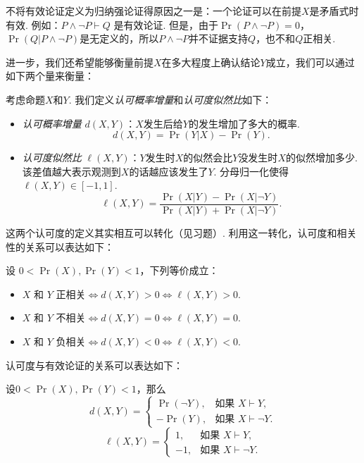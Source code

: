 不将有效论证定义为归纳强论证得原因之一是：一个论证可以在前提$X$是矛盾式时有效. 例如：$P \wedge \neg P \vdash Q$ 是有效论证. 但是，由于$\Pr(P \wedge \neg P) = 0$，$\Pr(Q | P \wedge \neg P)$是无定义的，所以$P \wedge \neg P$并不证据支持$Q$，也不和$Q$正相关.

进一步，我们还希望能够衡量前提$X$在多大程度上确认结论$Y$成立，我们可以通过如下两个量来衡量：
\begin{definition}[认可度]
考虑命题$X$和$Y$. 我们定义\emph{认可概率增量}和\emph{认可度似然比}如下：
\begin{itemize}
\item \emph{认可概率增量} $d(X, Y)$：$X$发生后给$Y$的发生增加了多大的概率.
\[
    d(X, Y) = \Pr(Y|X) - \Pr(Y).
\]
\item \emph{认可度似然比} $\ell(X, Y)$：$Y$发生时$X$的似然会比$Y$没发生时$X$的似然增加多少. 该差值越大表示观测到$X$的话越应该发生了$Y$. 分母归一化使得$\ell(X,Y)\in[-1,1]$.
\[
    \ell(X, Y) = \frac{\Pr(X|Y) - \Pr(X|\neg Y)}{\Pr(X|Y) + \Pr(X|\neg Y)}.
\]
\end{itemize} 
\end{definition}

这两个认可度的定义其实相互可以转化（见习题）. 利用这一转化，认可度和相关性的关系可以表达如下：
\begin{proposition}
    设 $0< \Pr(X),\Pr(Y) < 1$，下列等价成立：
    \begin{itemize}
        \item $X$ 和 $Y$ 正相关$\iff d(X,Y) > 0\iff \ell(X, Y) > 0$.
        \item $X$ 和 $Y$ 不相关$\iff d(X, Y) = 0\iff \ell(X, Y) = 0$. 
        \item $X$ 和 $Y$ 负相关$\iff d(X,Y) < 0\iff\ell(X, Y) < 0$.
    \end{itemize}    
\end{proposition}

认可度与有效论证的关系可以表达如下：
\begin{proposition}
    设$0< \Pr(X),\Pr(Y) < 1$，那么
    \[
        d(X, Y) =
        \begin{cases}
            \Pr(\neg Y),& \text{如果 } X \vdash Y, \\
            -\Pr(Y),& \text{如果 } X \vdash \neg Y.
        \end{cases}
    \]
    \[\ell(X, Y) = 
        \begin{cases}
            1,& \text{如果 } X \vdash Y, \\
            -1,& \text{如果 } X \vdash \neg Y.
        \end{cases}
    \]
\end{proposition}


